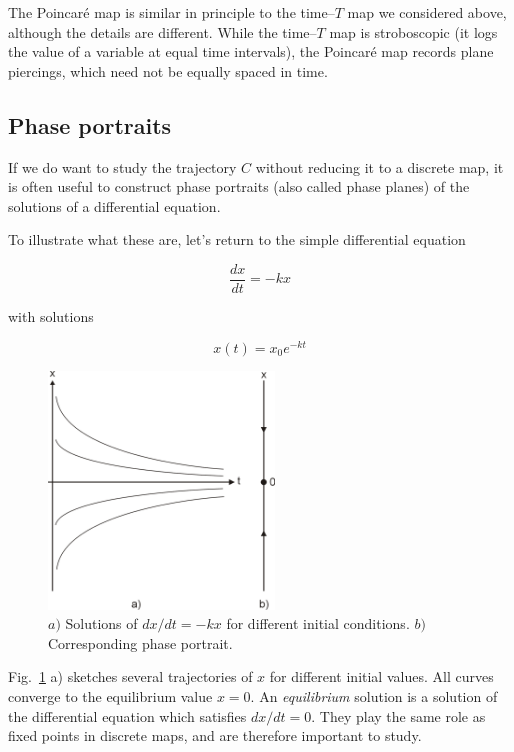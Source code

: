 The Poincar\'{e} map is similar in principle to the time--$T$ map we considered above, although the details are different. While the time--$T$ map is stroboscopic (it logs the value of a variable at equal time intervals), the Poincar\'{e} map records plane piercings, which need not be equally spaced in time.

\subsection{Phase portraits}

If we do want to study the trajectory $C$ without reducing it to a discrete map, it is often useful to construct phase portraits (also called phase planes) of the solutions of a differential equation. 

To illustrate what these are, let's return to the simple differential equation

\begin{equation}
\frac{dx}{dt} = -k x
\end{equation} 

with solutions

\begin{equation}
x(t) = x_0 e^{-kt}
\end{equation} 

\begin{figure}
\centering
\includegraphics[width=6cm]{dynamic/figures/phaseportrait}
\caption{$a)$ Solutions of ${dx}/{dt} = -k x$ for different initial conditions. $b)$ Corresponding phase portrait.}
\label{fig-phaseportrait}
\end{figure} 

Fig.~\ref{fig-phaseportrait} a) sketches several trajectories of $x$ for different initial values. All curves converge to the equilibrium value $x=0$. An \emph{equilibrium} solution is a solution of the differential equation which satisfies $dx/dt = 0$. They play the same role as fixed points in discrete maps, and are therefore important to study.

